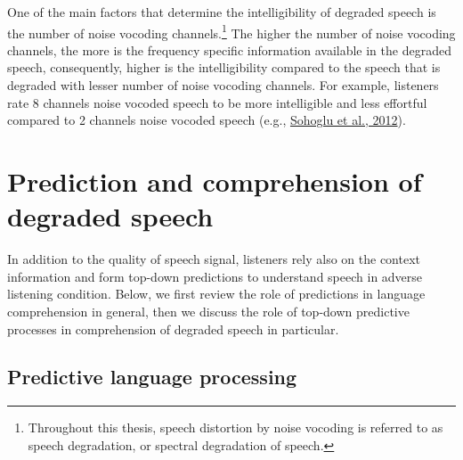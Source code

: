 \documentclass[a4paper, nobind]{templates/ociamthesis}
\begin{document}
One of the main factors that determine the intelligibility of degraded speech is the number of noise vocoding channels.\footnote{Throughout this thesis, speech distortion by noise vocoding is referred to as speech degradation, or spectral degradation of speech.}
The higher the number of noise vocoding channels, the more is the frequency specific information available in the degraded speech,
consequently, higher is the intelligibility compared to the speech that is degraded with lesser number of noise vocoding channels.
For example, listeners rate 8 channels noise vocoded speech to be more intelligible and less effortful compared to 2 channels noise vocoded speech (e.g., \protect\hyperlink{ref-Sohoglu2012}{Sohoglu et al., 2012}).

\hypertarget{prediction-and-comprehension-of-degraded-speech}{%
\section{Prediction and comprehension of degraded speech}\label{prediction-and-comprehension-of-degraded-speech}}

In addition to the quality of speech signal, listeners rely also on the context information and form top-down predictions to understand speech in adverse listening condition.
Below, we first review the role of predictions in language comprehension in general,
then we discuss the role of top-down predictive processes in comprehension of degraded speech in particular.

\hypertarget{predictive-language-processing}{%
\subsection{Predictive language processing}\label{predictive-language-processing}}
\end{document}
